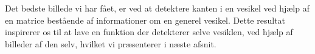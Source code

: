 Det bedste billede vi har fået, er ved at detektere kanten i en vesikel ved hjælp af en matrice bestående af informationer om en generel vesikel. Dette resultat inspirerer os til at lave en funktion der detekterer selve vesiklen, ved hjælp af billeder af den selv, hvilket vi præsenterer i næste afsnit. %

